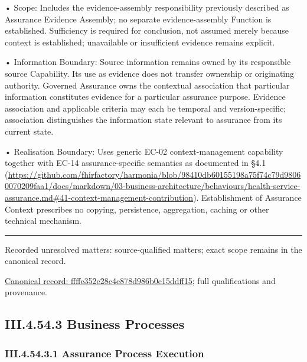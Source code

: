 •
Scope: Includes the evidence-assembly responsibility previously described as Assurance Evidence Assembly; no separate evidence-assembly Function is established. Sufficiency is required for conclusion, not assumed merely because context is established; unavailable or insufficient evidence remains explicit.



•
Information Boundary: Source information remains owned by its responsible source Capability. Its use as evidence does not transfer ownership or originating authority. Governed Assurance owns the contextual association that particular information constitutes evidence for a particular assurance purpose. Evidence association and applicable criteria may each be temporal and version-specific; association distinguishes the information state relevant to assurance from its current state.



•
Realisation Boundary: Uses generic EC-02 context-management capability together with EC-14 assurance-specific semantics as documented in §4.1 (\url{https://github.com/fhirfactory/harmonia/blob/98410db60155198a75f74c79d98060070209faa1/docs/markdown/03-business-architecture/behaviours/health-service-assurance.md#41-context-management-contribution}). Establishment of Assurance Context prescribes no copying, persistence, aggregation, caching or other technical mechanism.



\medskip\hrule\medskip

{\small Recorded unresolved matters: source-qualified matters; exact scope remains in the canonical record.}\par
{\footnotesize \href{../../../../continuum/business/business-function/ffffe352e28c4e878d986b0e15ddff15.md}{Canonical record: ffffe352e28c4e878d986b0e15ddff15}; full qualifications and provenance.}\par
\subsection*{III.4.54.3 Business Processes}
\label{navigation:III.4.54.3}

\subsubsection*{III.4.54.3.1 Assurance Process Execution}
\label{navigation:III.4.54.3.1}

